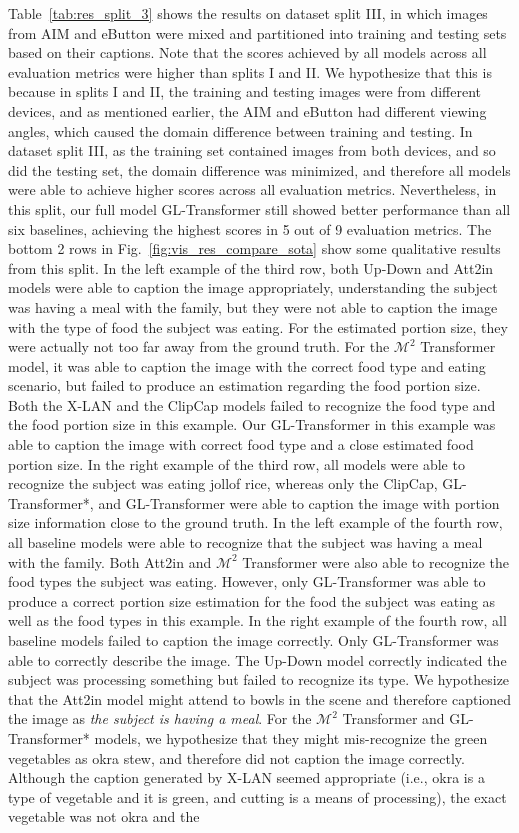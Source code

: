 \documentclass[journal]{IEEEtran}
\begin{document}
Table~\ref{tab:res_split_3} shows the results on dataset split III, in which images from AIM and eButton were mixed and partitioned into training and testing sets based on their captions. Note that the scores achieved by all models across all evaluation metrics were higher than splits I and II. We hypothesize that this is because in splits I and II, the training and testing images were from different devices, and as mentioned earlier, the AIM and eButton had different viewing angles, which caused the domain difference between training and testing. In dataset split III, as the training set contained images from both devices, and so did the testing set, the domain difference was minimized, and therefore all models were able to achieve higher scores across all evaluation metrics. Nevertheless, in this split, our full model GL-Transformer still showed better performance than all six baselines, achieving the highest scores in 5 out of 9 evaluation metrics. The bottom 2 rows in Fig.~\ref{fig:vis_res_compare_sota} show some qualitative results from this split. In the left example of the third row, both Up-Down and Att2in models were able to caption the image appropriately, understanding the subject was having a meal with the family, but they were not able to caption the image with the type of food the subject was eating. For the estimated portion size, they were actually not too far away from the ground truth. For the $\mathcal{M}^2$ Transformer model, it was able to caption the image with the correct food type and eating scenario, but failed to produce an estimation regarding the food portion size. Both the X-LAN and the ClipCap models failed to recognize the food type and the food portion size in this example. Our GL-Transformer in this example was able to caption the image with correct food type and a close estimated food portion size. In the right example of the third row, all models were able to recognize the subject was eating jollof rice, whereas only the ClipCap, GL-Transformer*, and GL-Transformer were able to caption the image with portion size information close to the ground truth. In the left example of the fourth row, all baseline models were able to recognize that the subject was having a meal with the family. Both Att2in and $\mathcal{M}^2$ Transformer were also able to recognize the food types the subject was eating. However, only GL-Transformer was able to produce a correct portion size estimation for the food the subject was eating as well as the food types in this example. In the right example of the fourth row, all baseline models failed to caption the image correctly. Only GL-Transformer was able to correctly describe the image. The Up-Down model correctly indicated the subject was processing something but failed to recognize its type. We hypothesize that the Att2in model might attend to bowls in the scene and therefore captioned the image as \textit{the subject is having a meal}. For the $\mathcal{M}^2$ Transformer and GL-Transformer* models, we hypothesize that they might mis-recognize the green vegetables as okra stew, and therefore did not caption the image correctly. Although the caption generated by X-LAN seemed appropriate (i.e., okra is a type of vegetable and it is green, and cutting is a means of processing), the exact vegetable was not okra and the 
\end{document}
